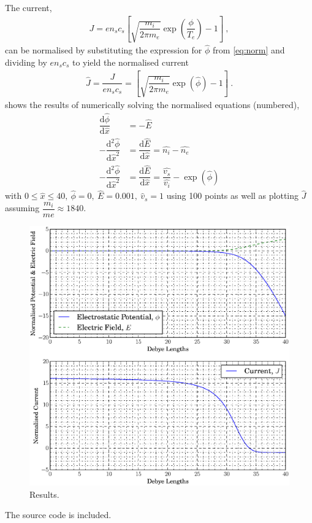 \documentclass[10pt,a4paper]{article}
\begin{document}
	The current,
	\begin{align} \label{eq:current}
		J = e n_{s} c_{s} \left[ \sqrt{\dfrac{m_{i}}{2 \pi m_{e}}} \exp\left(\dfrac{\phi}{T_{e}}\right) - 1 \right]~,
	\end{align}
	can be normalised by substituting the expression for $\hat{\phi}$ from \cref{eq:norm} and dividing by $e n_{s} c_{s}$ to yield the normalised current
	\begin{align} \label{eq:ncurrent}
		\hat{J} = \dfrac{J}{e n_{s} c_{s}} = \left[ \sqrt{\dfrac{m_{i}}{2 \pi m_{e}}} \exp\left(\hat{\phi}\right) - 1 \right]~.
	\end{align}
	 shows the results of numerically solving the normalised equations (numbered),
	\begin{subequations}
		\begin{align} \label{eq:derivs}
			\dfrac{\mathrm{d}\hat{\phi}}{\mathrm{d}\hat{x}} &= -\hat{E} \\
			-\dfrac{\mathrm{d}^{2}\hat{\phi}}{\mathrm{d} \hat{x}^{2}} &= \dfrac{\mathrm{d} \hat{E}}{\mathrm{d} \hat{x}} = \widehat{n_{i}} - \widehat{n_{e}} \nonumber\\
			-\dfrac{\mathrm{d}^{2}\hat{\phi}}{\mathrm{d} \hat{x}^{2}} &= \dfrac{\mathrm{d} \hat{E}}{\mathrm{d} \hat{x}} = \dfrac{\widehat{v_{s}}}{\widehat{v_{i}}} - \exp\left(\hat{\phi}\right)
		\end{align}
	\end{subequations}
	with $0 \leq \hat{x} \leq 40,~\hat{\phi} = 0,~\hat{E} = 0.001,~\hat{v}_{s} = 1$ using 100 points as well as plotting $\hat{J}$ assuming $\dfrac{m_{i}}{m{e}} \approx 1840$.
	\begin{figure}
		\includegraphics[width=\textwidth]{debye.eps}
		\caption{Results.}\label{fig:results}
	\end{figure}
	The source code is included.
	\inputminted[linenos = true,
				 breaklines, 
				 breakanywhere]{python}{assignment1.py}
\end{document}
